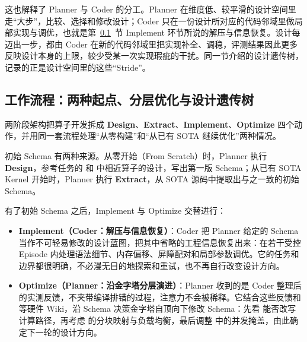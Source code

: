 \begin{DiagramBlock}
\end{DiagramBlock}
这也解释了 Planner 与 Coder 的分工。Planner 在维度低、较平滑的设计空间里走“大步”，比较、选择和修改设计；Coder 只在一份设计所对应的代码邻域里做局部实现与调优，也就是第~\ref{sec:design-tree-workflow}~节 Implement 环节所说的解压与信息恢复。设计每迈出一步，都由 Coder 在新的代码邻域里把实现补全、调稳，评测结果因此更多反映设计本身的上限，较少受某一次实现瑕疵的干扰。同一节介绍的设计遗传树，记录的正是设计空间里的这些“Stride”。


\SourceSeparator
\subsection{工作流程：两种起点、分层优化与设计遗传树}\label{sec:design-tree-workflow}
两阶段架构把算子开发拆成 \textbf{Design}、\textbf{Extract}、\textbf{Implement}、\textbf{Optimize} 四个动作，并用同一套流程处理“从零构建”和“从已有 SOTA 继续优化”两种情况。


初始 Schema 有两种来源。从零开始（From Scratch）时，Planner 执行 \textbf{Design}，参考任务的  和  中相近算子的设计，写出第一版 Schema；从已有 SOTA Kernel 开始时，Planner 执行 \textbf{Extract}，从 SOTA 源码中提取出与之一致的初始 Schema。


有了初始 Schema 之后，Implement 与 Optimize 交替进行：


\begin{itemize}
\item
\textbf{Implement（Coder：解压与信息恢复）}：Coder 把 Planner 给定的 Schema 当作不可轻易修改的设计蓝图，把其中省略的工程信息恢复出来：在若干受控 Episode 内处理语法细节、内存偏移、屏障配对和局部参数调优。它的任务和边界都很明确，不必漫无目的地探索和重试，也不再自行改变设计方向。


\item
\textbf{Optimize（Planner：沿金字塔分层演进）}：Planner 收到的是 Coder 整理后的实测反馈，不夹带编译排错的过程，注意力不会被稀释。它结合这些反馈和  等硬件 Wiki，沿 Schema 决策金字塔自顶向下修改 Schema：先看  能否改写计算路径，再考虑  的分块映射与负载均衡，最后调整  中的并发掩盖，由此确定下一轮的设计方向。


\end{itemize}

